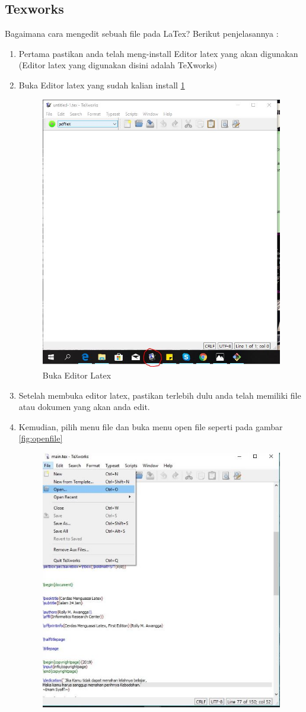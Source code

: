 \subsection{Texworks}
Bagaimana cara mengedit sebuah file pada LaTex? Berikut penjelasannya : 
\begin{enumerate}
\item Pertama pastikan anda telah meng-install Editor latex yang akan digunakan (Editor latex yang digunakan disini adalah TeXworks)
\item Buka Editor latex yang sudah kalian install \ref{fig:openeditor}
  \begin{figure}[!htbp]
  \centering
  \includegraphics[width=.75\textwidth]{figures/openeditor.JPG}
  \caption{Buka Editor Latex}\label{fig:openeditor}
\end{figure}
\item Setelah membuka editor latex, pastikan terlebih dulu anda telah memiliki file atau dokumen yang akan anda edit. 
\item Kemudian, pilih menu file dan buka menu open file seperti pada gambar \ref{fig:openfile}
  \begin{figure}[!htbp]
  \centering
  \includegraphics[width=.75\textwidth]{figures/openfile.JPG}

\end{figure}
\end{enumerate}
